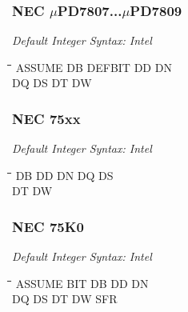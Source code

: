 \subsubsection{NEC $\mu$PD7807...$\mu$PD7809}

{\em Default Integer Syntax: Intel}

{\tt\begin{tabbing}
\hspace{3cm}\=\hspace{3cm}\=\hspace{3cm}\=\hspace{3cm}\=\kill
ASSUME     \> DB          \> DEFBIT      \>DD          \> DN \\
DQ         \> DS         \> DT          \> DW \\
\end{tabbing}}

\subsubsection{NEC 75xx}

{\em Default Integer Syntax: Intel}

{\tt\begin{tabbing}
\hspace{3cm}\=\hspace{3cm}\=\hspace{3cm}\=\hspace{3cm}\=\kill
DB         \> DD          \> DN          \> DQ          \>DS \\
DT         \> DW \\
\end{tabbing}}

\subsubsection{NEC 75K0}

{\em Default Integer Syntax: Intel}

{\tt\begin{tabbing}
\hspace{3cm}\=\hspace{3cm}\=\hspace{3cm}\=\hspace{3cm}\=\kill
ASSUME     \> BIT         \> DB          \> DD          \> DN \\
DQ         \> DS          \> DT          \> DW          \> SFR \\
\end{tabbing}}

